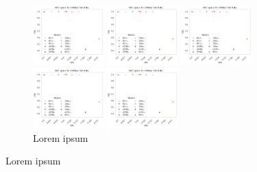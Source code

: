 \documentclass[a4paper,fleqn]{cas-sc}
\begin{document}
\begin{center}

\begin{figure}
	\centering
	\begin{subfigure}[b]{0.45\textwidth}
		\includegraphics[width=0.3\textwidth]{./figs/ROC-Space-Test-Data-10Mbps.png}		
		\caption{Lorem ipsum}
	    \quad
	 	\includegraphics[width=0.3\textwidth]{./figs/ROC-Space-Test-Data-10Mbps.png}
		\caption{Lorem ipsum}
        \quad
		\includegraphics[width=0.3\textwidth]{./figs/ROC-Space-Test-Data-10Mbps.png}
		\caption{Lorem ipsum}
        
		\includegraphics[width=0.3\textwidth]{./figs/ROC-Space-Test-Data-10Mbps.png}
		\caption{Lorem ipsum}
		\quad
		\includegraphics[width=0.3\textwidth]{./figs/ROC-Space-Test-Data-10Mbps.png}
		\caption{Lorem ipsum}
		

\end{subfigure}
\end{figure}
\end{center}
\end{document}

